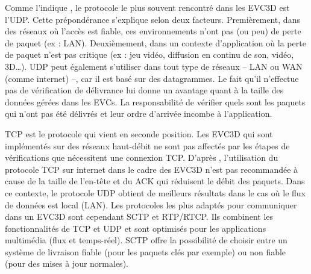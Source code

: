 Comme l'indique \cite{Roberto2014}, le protocole le plus souvent rencontré dans 
les \gls{EVC3D} est l'\gls{UDP}. 
Cette prépondérance s'explique selon deux facteurs. Premièrement, dans des 
réseaux où l'accès est fiable, ces environnements n'ont 
pas (ou peu) de perte de paquet (ex : \gls{LAN}). Deuxièmement, dans un contexte 
d'application où la perte de paquet n'est pas critique (ex : jeu vidéo, diffusion en 
continu de son, vidéo, \gls{3D}\dots). 
\gls{UDP} peut également s'utiliser dans tout type de réseaux -- \gls{LAN} ou 
\gls{WAN} (comme internet) --, car il est basé sur des datagrammes. Le fait qu'il 
n'effectue pas de vérification de délivrance lui donne un avantage quant 
à la taille des données gérées dans les \glspl{EVC}. La responsabilité de 
vérifier quels sont les 
paquets qui n'ont pas été délivrés et leur ordre d'arrivée incombe à l'application.

\gls{TCP} est le protocole qui vient en seconde position. Les \gls{EVC3D} qui sont 
implémentés sur des réseaux haut-débit ne sont pas affectés par les étapes de 
vérifications que nécessitent une connexion \gls{TCP}. D'après \cite{Sung2006}, 
l'utilisation du protocole \gls{TCP} sur internet dans le cadre des \gls{EVC3D} n'est 
pas recommandée à cause de la taille de l'en-tête et du ACK qui réduisent le débit 
des paquets.
Dans ce contexte, le protocole \gls{UDP} obtient de meilleurs résultats dans le cas 
où le flux de données est local (\gls{LAN}). 
Les protocoles les plus adaptés pour communiquer dans un \gls{EVC3D} sont 
cependant \acrshort{SCTP} et \gls{RTP}/\gls{RTCP}. Ils combinent les 
fonctionnalités de 
\gls{TCP} et \gls{UDP} et sont optimisés pour les applications multimédia (flux et 
temps-réel). \gls{SCTP} offre la possibilité de choisir entre un système de 
livraison fiable (pour les paquets clés par exemple) ou non fiable (pour des mises 
à jour normales).


